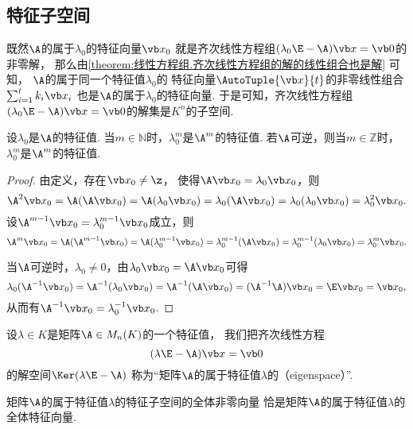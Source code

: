 \subsection{特征子空间}
既然\(\A\)的属于\(\lambda_0\)的特征向量\(\x_0\)
就是齐次线性方程组\((\lambda_0\E-\A)\x=\vb0\)的非零解，
那么由\cref{theorem:线性方程组.齐次线性方程组的解的线性组合也是解} 可知，
\(\A\)的属于同一个特征值\(\lambda_0\)的
特征向量\(\AutoTuple{\x}{t}\)的非零线性组合
\(\sum_{i=1}^t k_i \x_i\)
也是\(\A\)的属于\(\lambda_0\)的特征向量.
于是可知，齐次线性方程组\((\lambda_0\E-\A)\x=\vb0\)的解集是\(K^n\)的子空间.
\begin{proposition}
设\(\lambda_0\)是\(\A\)的特征值.
当\(m\in\mathbb{N}\)时，\(\lambda_0^m\)是\(\A^m\)的特征值.
若\(\A\)可逆，则当\(m\in\mathbb{Z}\)时，\(\lambda_0^m\)是\(\A^m\)的特征值.
\begin{proof}
由定义，存在\(\x_0\neq\z\)，
使得\(\A\x_0 = \lambda_0\x_0\)，则\[
	\A^2\x_0 = \A(\A\x_0)
	=\A(\lambda_0\x_0)
	=\lambda_0(\A\x_0)
	=\lambda_0(\lambda_0\x_0)
	=\lambda_0^2\x_0.
\]
设\(\A^{m-1}\x_0 = \lambda_0^{m-1}\x_0\)成立，则\[
	\A^m\x_0 = \A(\A^{m-1}\x_0)
	= \A(\lambda_0^{m-1}\x_0)
	= \lambda_0^{m-1}(\A\x_0)
	= \lambda_0^{m-1}(\lambda_0\x_0)
	= \lambda_0^m\x_0.
\]

当\(\A\)可逆时，\(\lambda_0\neq0\)，由\(\lambda_0\x_0 = \A\x_0\)可得\[
	\lambda_0(\A^{-1}\x_0)
	= \A^{-1}(\lambda_0\x_0)
	= \A^{-1}(\A\x_0)
	= (\A^{-1}\A)\x_0
	= \E\x_0
	= \x_0,
\]
从而有\(\A^{-1}\x_0 = \lambda_0^{-1}\x_0\).
\end{proof}
\end{proposition}

\begin{definition}
设\(\lambda \in K\)是矩阵\(\A \in M_n(K)\)的一个特征值，
我们把齐次线性方程\[
	(\lambda\E-\A)\x=\vb0
\]的解空间\(\Ker(\lambda\E-\A)\)
称为“矩阵\(\A\)的属于特征值\(\lambda\)的（eigenspace）”.
\end{definition}

\begin{proposition}
矩阵\(\A\)的属于特征值\(\lambda\)的特征子空间的全体非零向量
恰是矩阵\(\A\)的属于特征值\(\lambda\)的全体特征向量.
\end{proposition}

